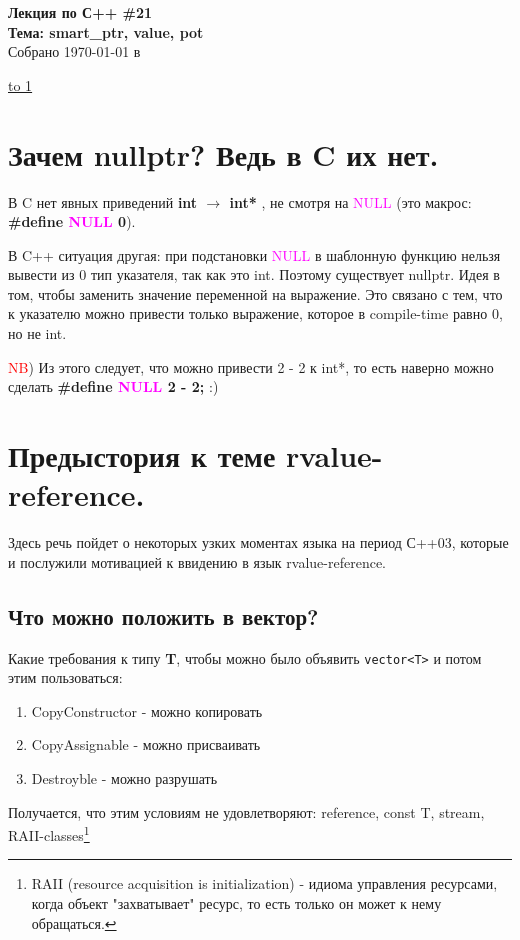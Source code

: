 \documentclass[12pt]{article}
\begin{document}
    \begin{center}

    {\Large \bf Лекция по С++ \#21} \\
    \vspace{0.5em}
    {\Large \bf Тема: smart\_ptr, value, pot} \\
    \vspace{0.5em}
    {\large Собрано {\today} в {\currenttime}}


    \end{center}
\underline{\hbox to 1\textwidth{{ } \hfil{ } \hfil{ } }}

\tableofcontents

\newpage
\section{Зачем nullptr? Ведь в C их нет.}
В C нет явных приведений {\bf int $\to$ int* }, не смотря на \textcolor{magenta}{NULL} (это макрос: {\bf \#define \textcolor{magenta}{NULL} 0}).


В C++ ситуация другая: при подстановки \textcolor{magenta}{NULL} в шаблонную функцию нельзя вывести из 0 тип указателя, так как это int. Поэтому существует nullptr. Идея в том, чтобы заменить значение переменной на выражение. Это связано с тем, что к указателю можно привести только выражение, которое в compile-time равно 0, но не int.


\textcolor{red}{NB}) Из этого следует, что можно привести 2 - 2 к int*, то есть наверно можно сделать {\bf \#define \textcolor{magenta}{NULL} 2 - 2; } :)

\section{Предыстория к теме rvalue-reference.}
Здесь речь пойдет о некоторых узких моментах языка на период С++03, которые и послужили мотивацией к ввидению в язык rvalue-reference.
\subsection{Что можно положить в вектор?}
Какие требования к типу {\bf T}, чтобы можно было объявить \texttt{vector<T>} и потом этим пользоваться:
\begin{enumerate}
\item CopyConstructor - можно копировать
\item CopyAssignable - можно присваивать
\item Destroyble - можно разрушать
\end{enumerate}
Получается, что этим условиям не удовлетворяют: reference, const T, stream, RAII-classes\footnote{ RAII (resource acquisition is initialization) - идиома управления ресурсами, когда объект "захватывает" ресурс, то есть только он может к нему обращаться.}
\end{document}
